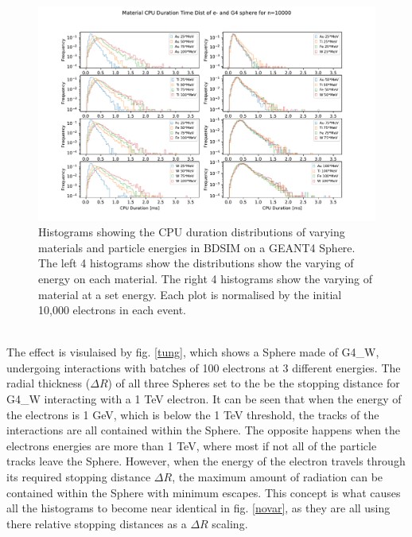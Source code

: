 \documentclass[12pt,a4paper]{article}
\begin{document}
\begin{figure}[h!]
\centering
\includegraphics[scale=0.6]{Images//Materials//Varied_by_radius_and_secondaries.pdf}
\caption[width=\columnwidth]{Histograms showing the CPU duration distributions of varying materials and particle energies in BDSIM on a GEANT4 Sphere. The left 4 histograms show the distributions show the varying of energy on each material. The right 4 histograms show the varying of material at a set energy. Each plot is normalised by the initial 10,000 electrons in each event.}
\label{var}
\end{figure}
\\
\noindent The effect is visulaised by fig. \ref{tung}, which shows a Sphere made of G4\_W, undergoing interactions with batches of 100 electrons at 3 different energies. The radial thickness ($\Delta R$) of all three Spheres set to the be the stopping distance for G4\_W interacting with a 1 TeV electron. It can be seen that when the energy of the electrons is 1 GeV, which is below the 1 TeV threshold, the tracks of the interactions are all contained within the Sphere. The opposite happens when the electrons energies are more than 1 TeV, where most if not all of the particle tracks leave the Sphere. However, when the energy of the electron travels through its required stopping distance $\Delta R$, the maximum amount of radiation can be contained within the Sphere with minimum escapes. This concept is what causes all the histograms to become near identical in fig. \ref{novar}, as they are all using there relative stopping distances as a $\Delta R$ scaling.
\end{document}
